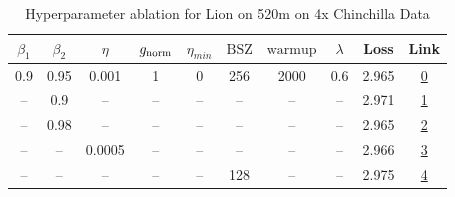 \begin{table}[H]
\centering
\caption{Hyperparameter ablation for Lion on 520m on 4x Chinchilla Data}
\label{tab:ablation_lion_520m_on_4x_chinchilla_data}
\begin{tabular}{cccccccccc}
\toprule
$\beta_1$ & $\beta_2$ & $\eta$ & $g_{\mathrm{norm}}$ & $\eta_{min}$ & $\mathrm{BSZ}$ & $\mathrm{warmup}$ & $\lambda$ & Loss & Link \\
\midrule
0.9 & 0.95 & 0.001 & 1 & 0 & 256 & 2000 & 0.6 & 2.965 & \href{https://wandb.ai/marin-community/optimizer-scaling/runs/sweep-520m-42B-lion30535dlr0.001-wd0.6-minlr0-warmup2000-b10.9-b-b687e1}{0} \\
\midrule
-- & 0.9 & -- & -- & -- & -- & -- & -- & 2.971 & \href{https://wandb.ai/marin-community/optimizer-scaling/runs/sweep-520m-42B-lion6d497blr0.001-wd0.6-minlr0-warmup2000-b10.9-b-d19dd3}{1} \\
-- & 0.98 & -- & -- & -- & -- & -- & -- & 2.965 & \href{https://wandb.ai/marin-community/optimizer-scaling/runs/sweep-520m-42B-lion70e78flr0.001-wd0.6-minlr0-warmup2000-b10.9-b-fa40d0}{2} \\
-- & -- & 0.0005 & -- & -- & -- & -- & -- & 2.966 & \href{https://wandb.ai/marin-community/optimizer-scaling/runs/sweep-520m-42B-lion9e353dlr0.0005-wd0.6-minlr0-warmup2000-b10.9--e8f576}{3} \\
-- & -- & -- & -- & -- & 128 & -- & -- & 2.975 & \href{https://wandb.ai/marin-community/optimizer-scaling/runs/sweep-520m-42B-lion2b623elr0.001-wd0.6-minlr0-warmup2000-b10.9-b-f4b0ad}{4} \\
\bottomrule
\end{tabular}
\end{table}

